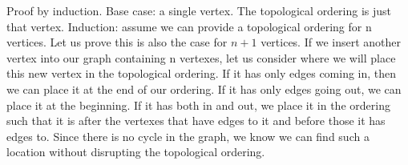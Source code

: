 \documentclass[solution, letterpaper]{cs20inclass}
\begin{document}
\begin{solution}
Proof by induction. Base case: a single vertex. The topological ordering is just that vertex. Induction: assume we can provide a topological ordering for n vertices. Let us prove this is also the case for $n+1$ vertices. If we insert another vertex into our graph containing n vertexes, let us consider where we will place this new vertex in the topological ordering. If it has only edges coming in, then we can place it at the end of our ordering. If it has only edges going out, we can place it at the beginning. If it has both in and out, we place it in the ordering such that it is after the vertexes that have edges to it and before those it has edges to. Since there is no cycle in the graph, we know we can find such a location without disrupting the topological ordering. 
\end{solution}
\end{document}
